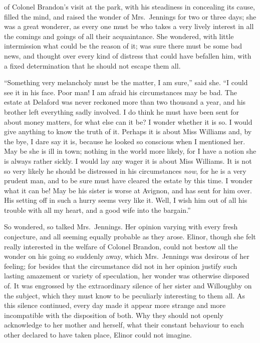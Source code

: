  of Colonel Brandon's visit
at the park, with his steadiness in concealing its cause,
filled the mind, and raised the wonder of Mrs.\ Jennings
for two or three days; she was a great wonderer, as every
one must be who takes a very lively interest in all the
comings and goings of all their acquaintance.  She wondered,
with little intermission what could be the reason of it;
was sure there must be some bad news, and thought over
every kind of distress that could have befallen him,
with a fixed determination that he should not escape
them all.

``Something very melancholy must be the matter,
I am sure,'' said she.  ``I could see it in his face.
Poor man!  I am afraid his circumstances may be bad.
The estate at Delaford was never reckoned more than two thousand
a year, and his brother left everything sadly involved.
I do think he must have been sent for about money matters,
for what else can it be?  I wonder whether it is so.
I would give anything to know the truth of it.  Perhaps it
is about Miss Williams and, by the bye, I dare say it is,
because he looked so conscious when I mentioned her.
May be she is ill in town; nothing in the world more likely,
for I have a notion she is always rather sickly.
I would lay any wager it is about Miss Williams.
It is not so very likely he should be distressed in
his circumstances \emph{now}, for he is a very prudent man,
and to be sure must have cleared the estate by this time.
I wonder what it can be!  May be his sister is worse
at Avignon, and has sent for him over.  His setting off
in such a hurry seems very like it.  Well, I wish him out
of all his trouble with all my heart, and a good wife into
the bargain.''

So wondered, so talked Mrs.\ Jennings.  Her opinion
varying with every fresh conjecture, and all seeming
equally probable as they arose.  Elinor, though she felt
really interested in the welfare of Colonel Brandon,
could not bestow all the wonder on his going so suddenly
away, which Mrs.\ Jennings was desirous of her feeling;
for besides that the circumstance did not in her opinion
justify such lasting amazement or variety of speculation,
her wonder was otherwise disposed of.  It was engrossed
by the extraordinary silence of her sister and Willoughby
on the subject, which they must know to be peculiarly
interesting to them all.  As this silence continued,
every day made it appear more strange and more incompatible
with the disposition of both.  Why they should not openly
acknowledge to her mother and herself, what their constant
behaviour to each other declared to have taken place,
Elinor could not imagine.


